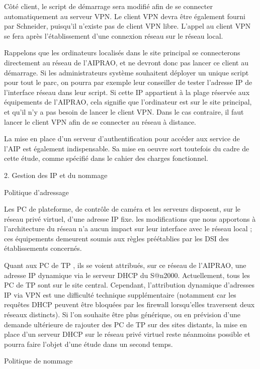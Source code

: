 {	Côté client, le script de démarrage sera modifié afin de se connecter automatiquement au serveur VPN. Le client VPN devra être également fourni par Schneider, puisqu'il n'existe pas de client VPN libre. L'appel au client VPN se fera après l'établissement d'une connexion réseau sur le réseau local.

	Rappelons que les ordinateurs localisés dans le site principal se connecterons directement au  réseau de l'AIPRAO, et ne devront donc pas lancer ce client au démarrage. Si les administrateurs système souhaitent déployer un unique script pour tout le parc, on pourra par exemple leur conseiller de tester l'adresse IP de l'interface réseau dans leur script. Si cette IP appartient à la plage réservée aux équipements de l'AIPRAO, cela signifie que l'ordinateur est sur le site principal, et qu'il n'y a pas besoin de lancer le client VPN. Dans le cas contraire, il faut lancer le  client VPN afin de se connecter au réseau à distance.

	La mise en place d'un serveur d'authentification pour accéder aux service de l'AIP est également indispensable. Sa mise en oeuvre sort toutefois du cadre de cette étude,  comme spécifié dans le cahier des charges fonctionnel.
 
2. Gestion des IP et du nommage

Politique d'adressage

	Les PC de plateforme, de contrôle de caméra et les serveurs disposent, sur le réseau privé virtuel, d'une adresse IP fixe. les modifications que nous apportons à l'architecture du réseau n'a aucun impact sur leur interface avec le réseau local ; ces équipements demeurent soumis aux règles préétablies par les DSI des établissements concernés.

	Quant aux PC de TP , ils se voient attribués, sur ce réseau de l'AIPRAO, une adresse IP dynamique via le serveur DHCP du S@n2000. 
	Actuellement, tous les PC de TP sont sur le site central. Cependant, l'attribution dynamique d'adresses IP via VPN est une difficulté technique supplémentaire (notamment car les requêtes DHCP peuvent être bloquées par les firewall lorsqu'elles traversent deux réseaux distincts). 
	Si l'on souhaite être plus générique, ou en prévision d'une demande ultérieure de rajouter des PC de TP sur des sites distants, la mise en place d'un serveur DHCP sur le réseau privé virtuel reste néanmoins possible et pourra faire l'objet d'une étude dans un second temps.


Politique de nommage

}
